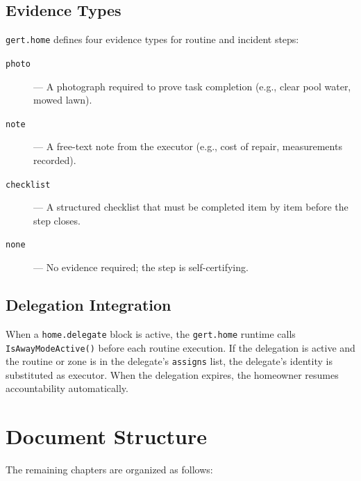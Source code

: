 \subsection{Evidence Types}

\texttt{gert.home} defines four evidence types for routine and incident steps:

\begin{description}
  \item[\texttt{photo}] --- A photograph required to prove task completion (e.g., clear pool
        water, mowed lawn).
  \item[\texttt{note}] --- A free-text note from the executor (e.g., cost of repair,
        measurements recorded).
  \item[\texttt{checklist}] --- A structured checklist that must be completed item by item
        before the step closes.
  \item[\texttt{none}] --- No evidence required; the step is self-certifying.
\end{description}

\subsection{Delegation Integration}

When a \texttt{home.delegate} block is active, the \texttt{gert.home} runtime calls
\texttt{IsAwayModeActive()} before each routine execution. If the delegation is active and the
routine or zone is in the delegate's \texttt{assigns} list, the delegate's identity is
substituted as executor. When the delegation expires, the homeowner resumes accountability
automatically.

\section{Document Structure}
\label{sec:intro-structure}

The remaining chapters are organized as follows:

